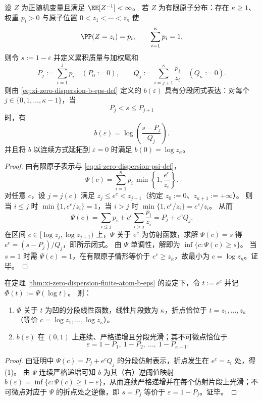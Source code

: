 \begin{theorem}\label{thm:xi-zero-dispersion-finite-atom-b-eps}
设 \(Z\) 为正随机变量且满足 \(\EE[Z^{-1}]<\infty\)。
若 \(Z\) 为有限原子分布：存在 \(\kappa\ge 1\)、权重 \(p_i>0\) 与原子位置 \(0<z_1<\cdots<z_\kappa\) 使
\[
\PP(Z=z_i)=p_i,\qquad \sum_{i=1}^{\kappa}p_i=1,
\]
则令 \(s:=1-\varepsilon\) 并定义累积质量与加权尾和
\[
P_j:=\sum_{i=1}^{j}p_i\quad(P_0:=0),\qquad
Q_j:=\sum_{i=j+1}^{\kappa}\frac{p_i}{z_i}\quad(Q_\kappa:=0).
\]
则由 \eqref{eq:xi-zero-dispersion-b-eps-def} 定义的 \(b(\varepsilon)\) 具有分段闭式表达：对每个 \(j\in\{0,1,\dots,\kappa-1\}\)，当
\[
P_j<s\le P_{j+1}
\]
时，有
\[
b(\varepsilon)=\log\!\left(\frac{s-P_j}{Q_j}\right).
\]
并且将 \(b\) 以连续方式延拓到 \(\varepsilon=0\) 时满足
\(
b(0)=\log z_\kappa
\)。
\end{theorem}
\begin{proof}
由有限原子表示与 \eqref{eq:xi-zero-dispersion-psi-def}，
\[
\Psi(c)=\sum_{i=1}^{\kappa}p_i\,\min\!\left\{1,\frac{e^c}{z_i}\right\}.
\]
对任意 \(c\)，设 \(j=j(c)\) 满足 \(z_j\le e^c<z_{j+1}\)（约定 \(z_0:=0\)、\(z_{\kappa+1}:=+\infty\)）。
则当 \(i\le j\) 时 \(\min\{1,e^c/z_i\}=1\)，当 \(i>j\) 时 \(\min\{1,e^c/z_i\}=e^c/z_i\)。
从而
\[
\Psi(c)=\sum_{i\le j}p_i+e^c\sum_{i>j}\frac{p_i}{z_i}=P_j+e^cQ_j.
\]
在区间 \(c\in[\log z_j,\log z_{j+1})\) 上，\(\Psi\) 关于 \(e^c\) 为仿射函数，求解 \(\Psi(c)=s\) 得
\(
e^c=(s-P_j)/Q_j
\)，即所示闭式。
由 \(\Psi\) 单调性，解即为 \(\inf\{c:\Psi(c)\ge s\}\)。
当 \(s=1\) 时需 \(\Psi(c)=1\)，在有限原子情形等价于 \(e^c\ge z_\kappa\)，故最小为 \(c=\log z_\kappa\)。证毕。
\end{proof}

\begin{corollary}\label{cor:xi-zero-dispersion-kinks}
在定理 \ref{thm:xi-zero-dispersion-finite-atom-b-eps} 的设定下，令 \(t:=e^c\) 并记 \(\Phi(t):=\Psi(\log t)\)。
则：
\begin{enumerate}
  \item \(\Phi\) 关于 \(t\) 为凹的分段线性函数，线性片段数为 \(\kappa\)，折点恰位于 \(t=z_1,\dots,z_\kappa\)（等价 \(c=\log z_1,\dots,\log z_\kappa\)）。
  \item \(b(\varepsilon)\) 在 \((0,1)\) 上连续、严格递增且分段光滑；其不可微点恰位于
  \[
  \varepsilon=1-P_1,\ 1-P_2,\ \dots,\ 1-P_{\kappa-1}.
  \]
\end{enumerate}
\end{corollary}
\begin{proof}
由证明中 \(\Psi(c)=P_j+e^cQ_j\) 的分段仿射表示，折点发生在 \(e^c=z_i\) 处，得 (1)。
由 \(\Psi\) 连续严格递增可知 \(b\) 为其（右）逆阈值映射 \(b(\varepsilon)=\inf\{c:\Psi(c)\ge 1-\varepsilon\}\)，从而连续严格递增并在每个仿射片段上光滑；不可微点对应于 \(\Psi\) 的折点处之逆像，即 \(s=P_j\) 等价于 \(\varepsilon=1-P_j\)。证毕。
\end{proof}

